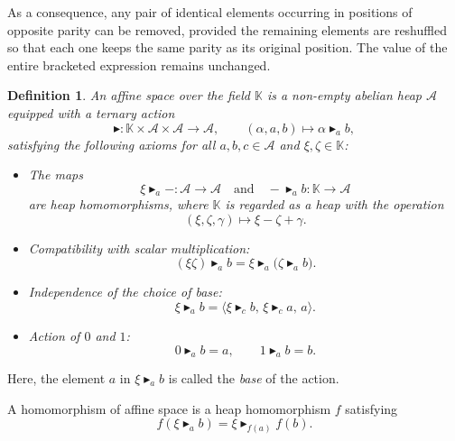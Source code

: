 \documentclass[14pt]{article}
\theoremstyle{Definition}
\newtheorem{Def}[thm]{Definition}
\theoremstyle{remark}
\begin{document}
As a consequence, any pair of identical elements occurring in positions 
of opposite parity can be removed, provided the remaining elements are 
reshuffled so that each one keeps the same parity as its original position. 
The value of the entire bracketed expression remains unchanged.
\begin{Def}\cite{Brz1}\label{Def2.3}  
An \emph{affine space} over the field $\mathbb{K}$ is a non-empty abelian heap $\mathcal{A}$ equipped with a ternary action
\[
\blacktriangleright : \mathbb{K} \times \mathcal{A} \times \mathcal{A} \longrightarrow \mathcal{A}, 
\qquad
(\alpha, a, b) \longmapsto \alpha \blacktriangleright_a b,
\]
satisfying the following axioms for all $a,b,c \in \mathcal{A}$ and $\xi,\zeta \in \mathbb{K}$:

\begin{itemize}
    \item[(a)] The maps 
    \[
    \xi \blacktriangleright_a - : \mathcal{A} \to \mathcal{A} 
    \quad\text{and}\quad
    - \blacktriangleright_a b : \mathbb{K} \to \mathcal{A}
    \]
    are heap homomorphisms, where $\mathbb{K}$ is regarded as a heap with the operation 
    \[
    (\xi,\zeta,\gamma) \longmapsto \xi - \zeta + \gamma.
    \]

    \item[(b)] Compatibility with scalar multiplication:
    \[
    (\xi \zeta) \blacktriangleright_a b = 
    \xi \blacktriangleright_a \!\bigl(\zeta \blacktriangleright_a b\bigr).
    \]

    \item[(c)] Independence of the choice of base:
    \[
    \xi \blacktriangleright_a b 
    = 
    \bigl\langle 
      \xi \blacktriangleright_c b,\,
      \xi \blacktriangleright_c a,\,
      a
    \bigr\rangle.
    \]

    \item[(d)] Action of $0$ and $1$:
    \[
    0 \blacktriangleright_a b = a,
    \qquad 
    1 \blacktriangleright_a b = b.
    \]
\end{itemize}
\end{Def}
Here, the element $a$ in $\xi \blacktriangleright_a b$ is called the \emph{base} of the action.  

A homomorphism of affine space is a heap homomorphism $f$ satisfying
\[
f(\xi \blacktriangleright_a b) 
= 
\xi \blacktriangleright_{f(a)} f(b).
\]
\end{document}
